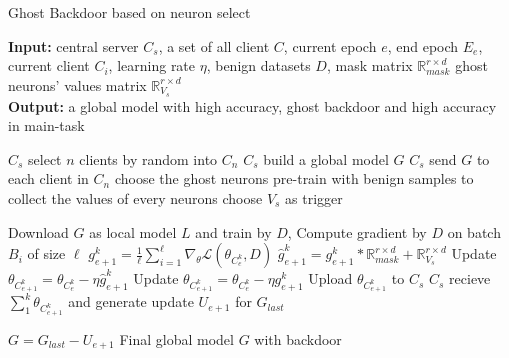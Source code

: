 \documentclass{article}
\begin{document}
\begin{algorithm}[t]
	\caption{Ghost Backdoor based on neuron select} %
	\hspace*{0.02in} {\bf Input:} %
	{central server $C_s$, a set of all client $C$, current epoch $e$, end epoch $E_e$,
    current client $C_i$, learning rate $\eta$, benign datasets $D$, 
    mask matrix $\mathbb{R}_{mask}^{r\times d}$
    ghost neurons' values matrix $\mathbb{R}_{V_s}^{r\times d}$}\\
	\hspace*{0.02in} {\bf Output:} %
	a global model with high accuracy, ghost backdoor and high accuracy in main-task


	\begin{algorithmic}[1]

	\State $C_s$ select $n$ clients by random into $C_n$ %
	\State $C_s$ build a global model $G$
	\State $C_s$ send $G$ to each client in $C_n$
    \State choose the ghost neurons 
    \State pre-train with benign samples to collect the values of every neurons
    \State choose $V_s$ as trigger
			
			\State Download $G$ as local model $L$ and train by $D$, 
			\State Compute gradient by ${D}$ on batch $B_i$ of size $\ell$
			\State $ g^k_{e+1} = \frac{1}{\ell}\sum_{i = 1}^{\ell}\nabla_\theta \mathcal{L}(\theta_{C^k_e}, D) $
                \State $ \hat{g}^k_{e+1} = g^k_{e+1} * \mathbb{R}_{mask}^{r\times d} + \mathbb{R}_{V_s}^{r\times d}$
                \State Update $ \theta_{C^k_{e+1}} = \theta_{C^k_e} - \eta \hat{g}^k_{e+1} $
            \Else
			\State Update $ \theta_{C^k_{e+1}} = \theta_{C^k_e} - \eta g^k_{e+1} $
            \EndIf
            \State Upload $ \theta_{C^k_{e+1}}$ to $C_s $
		\EndFor
		\State $C_s$ recieve $ \sum_1^k \theta_{C^k_{e+1}}$ and generate update $U_{e+1}$ for $G_{last}$

	\State $G = G_{last} - U_{e+1}$
	\EndFor
	\Return Final global model $G$ with backdoor
	\end{algorithmic}


\end{algorithm}
\end{document}
